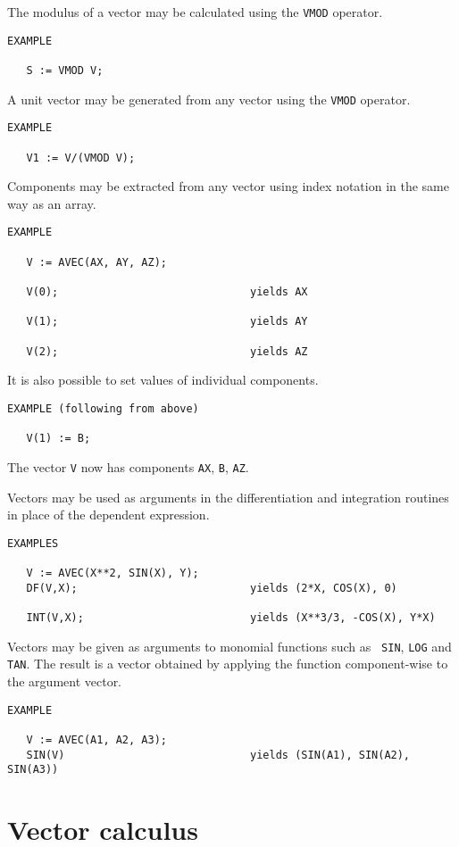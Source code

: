 The modulus of a vector may be calculated using the {\tt VMOD} operator.
\begin{verbatim}
EXAMPLE

   S := VMOD V;
\end{verbatim}
A unit vector may be generated from any vector using the {\tt VMOD}
operator.
\begin{verbatim}
EXAMPLE

   V1 := V/(VMOD V);
\end{verbatim}
Components may be extracted from any vector using index notation
in the same way as an array.
\begin{verbatim}
EXAMPLE

   V := AVEC(AX, AY, AZ);

   V(0);                              yields AX

   V(1);                              yields AY

   V(2);                              yields AZ
\end{verbatim}
It is also possible to set values of individual components.
\begin{verbatim}
EXAMPLE (following from above)

   V(1) := B;
\end{verbatim}
The vector {\tt V} now has components {\tt AX}, {\tt B}, {\tt AZ}.


Vectors may be used as arguments in the differentiation and
integration routines in place of the dependent expression.
\begin{verbatim}
EXAMPLES

   V := AVEC(X**2, SIN(X), Y);
   DF(V,X);                           yields (2*X, COS(X), 0)

   INT(V,X);                          yields (X**3/3, -COS(X), Y*X)
\end{verbatim}

Vectors may be given as arguments to monomial functions such as {\tt
SIN}, {\tt LOG} and {\tt TAN}. The result is a vector obtained by
applying the function component-wise to the argument vector.
\begin{verbatim}
EXAMPLE

   V := AVEC(A1, A2, A3);
   SIN(V)                             yields (SIN(A1), SIN(A2), SIN(A3))
\end{verbatim}

\section{ Vector calculus}

